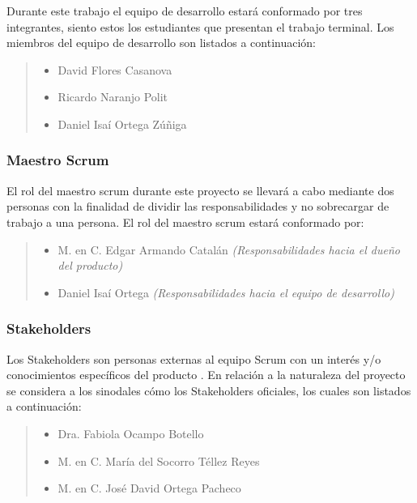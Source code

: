  Durante este trabajo el equipo de desarrollo estará conformado por tres integrantes,
 siento estos los estudiantes que presentan el trabajo terminal. Los miembros del
 equipo de desarrollo son listados a continuación:

    \begin{quote}
    \begin{itemize}
        \item David Flores Casanova
        \item Ricardo Naranjo Polit
        \item Daniel Isaí Ortega Zúñiga
    \end{itemize}
    \end{quote}

\subsubsection{Maestro Scrum}

 El rol del maestro scrum durante este proyecto se llevará a cabo mediante dos
 personas con la finalidad de dividir las responsabilidades y no sobrecargar de
 trabajo a una persona. El rol del maestro scrum estará conformado por:

    \begin{quote}
    \begin{itemize}
        \item M. en C. Edgar Armando Catalán
                       {\it(Responsabilidades hacia el dueño del producto)}
        \item Daniel Isaí Ortega
                       {\it(Responsabilidades hacia el equipo de desarrollo)}
    \end{itemize}
    \end{quote}


\subsubsection{Stakeholders}

 Los Stakeholders son personas externas al equipo Scrum con un interés y/o
 conocimientos específicos del producto \cite{ScrumGlosary}. En relación a la
 naturaleza del proyecto se considera a los sinodales cómo los Stakeholders oficiales,
 los cuales son listados a continuación:

    \begin{quote}
    \begin{itemize}
        \item Dra. Fabiola Ocampo Botello
        \item M. en C. María del Socorro Téllez Reyes
        \item M. en C. José David Ortega Pacheco
    \end{itemize}
    \end{quote}

